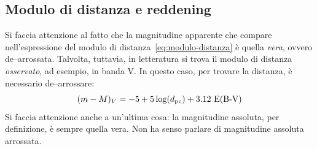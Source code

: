 \subsection{Modulo di distanza e reddening}
Si faccia attenzione al fatto che la magnitudine apparente che compare nell'espressione del modulo di distanza~\eqref{eq:modulo-distanza} è quella \emph{vera}, ovvero de--arrossata. Talvolta, tuttavia, in letteratura si trova il modulo di distanza \emph{osservato}, ad esempio, in banda V. In questo caso, per trovare la distanza, è necessario de--arrossare:
\[
    (m - M)_V = -5 + 5 \log(d_{\si{pc}}) + 3.12 \, \EBV
\]
Si faccia attenzione anche a un'ultima cosa: la magnitudine assoluta, per definizione, è sempre quella vera. Non ha senso parlare di magnitudine assoluta arrossata.